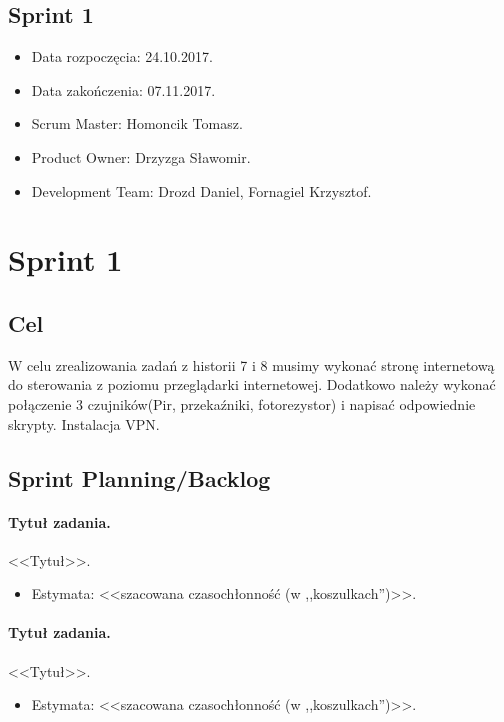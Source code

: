 	\subsection{Sprint 1}
	
	\begin{itemize}
		\item Data rozpoczęcia: 24.10.2017.
		\item Data zakończenia: 07.11.2017.
		\item Scrum Master: Homoncik Tomasz.
		\item Product Owner: Drzyzga Sławomir.
		\item Development Team: Drozd Daniel, Fornagiel Krzysztof.
	\end{itemize}
	
	\section{Sprint 1}
	\subsection{Cel} 

	
	W celu zrealizowania zadań z historii 7 i 8 musimy wykonać stronę internetową do sterowania z poziomu przeglądarki internetowej. Dodatkowo należy wykonać połączenie 3 czujników(Pir, przekaźniki, fotorezystor) i napisać odpowiednie skrypty. Instalacja VPN.
	
	
	
	\subsection{Sprint Planning/Backlog}
	
	\paragraph{Tytuł zadania.} <<Tytuł>>.
	\begin{itemize}
		\item Estymata: <<szacowana czasochłonność (w ,,koszulkach'')>>.
	\end{itemize}
	
	\paragraph{Tytuł zadania.} <<Tytuł>>.
	\begin{itemize}
		\item Estymata: <<szacowana czasochłonność (w ,,koszulkach'')>>.
	\end{itemize}
	
